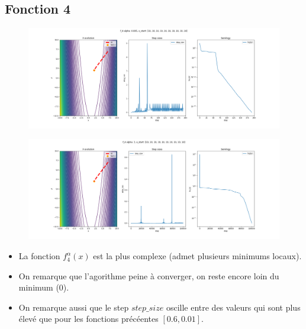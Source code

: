 \documentclass[twoside,10pt,a4paper]{article}
\numberwithin{equation}{section}					%
\numberwithin{figure}{section}						%
\begin{document}
\subsection{Fonction 4 }\label{sec:subsection2}
\begin{figure}[H]
    \centering
    \includegraphics[width=\textwidth]{imgs/adaptatif_sz/f_4_a-0.005_adaptatif.png}
    \caption{}
\end{figure}
\begin{figure}[H]
    \centering
    \includegraphics[width=\textwidth]{imgs/adaptatif_sz/f_4_a-3_adaptatif.png}
    \caption{}
\end{figure}
\begin{itemize}
	\item La fonction $f_4^{\alpha}(x)$ est la plus complexe (admet plusieurs minimums locaux).
	\item On remarque que l'agorithme peine à converger, on reste encore loin du minimum (0).
	\item On remarque aussi que le step $step\_size$ oscille entre des valeurs qui sont plus élevé que pour les fonctions précéentes $[0.6, 0.01]$.

\end{itemize}
\end{document}
